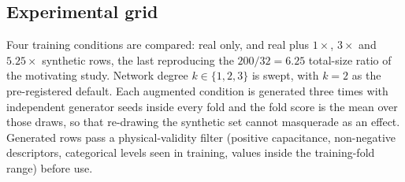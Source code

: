 \subsection{Experimental grid}
Four training conditions are compared: real only, and real plus $1\times$, $3\times$ and
$5.25\times$ synthetic rows, the last reproducing the $200/32 = 6.25$ total-size ratio of the
motivating study. Network degree $k \in \{1,2,3\}$ is swept, with $k=2$ as the
pre-registered default. Each augmented condition is generated three times with independent
generator seeds inside every fold and the fold score is the mean over those draws, so that
re-drawing the synthetic set cannot masquerade as an effect. Generated rows pass a
physical-validity filter (positive capacitance, non-negative descriptors, categorical levels
seen in training, values inside the training-fold range) before use.
